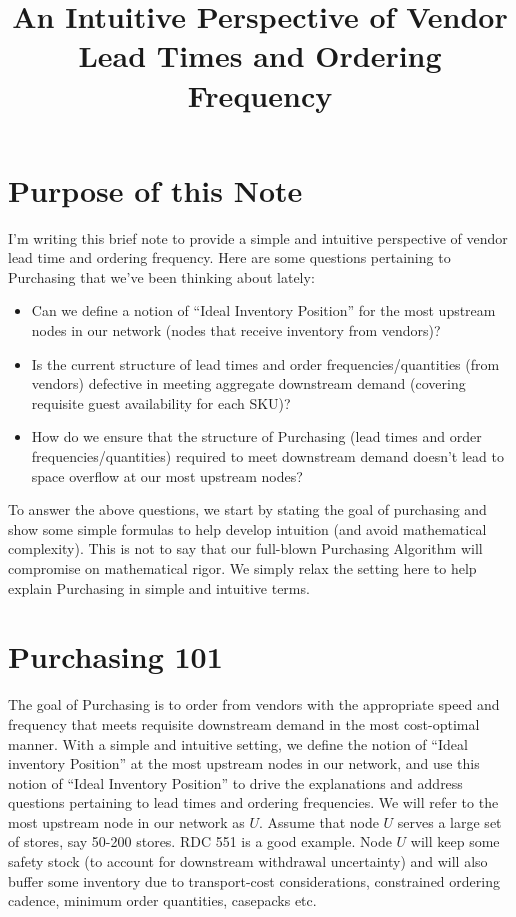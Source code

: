 \documentclass[11pt]{amsart}
\title{An Intuitive Perspective of Vendor Lead Times and Ordering Frequency}
\date{} %
\begin{document}
\maketitle

\section{Purpose of this Note}

I'm writing this brief note to provide a simple and intuitive perspective of vendor lead time and ordering frequency. Here are some questions pertaining to Purchasing that we've been thinking about lately:

\begin{itemize}
\item Can we define a notion of ``Ideal Inventory Position'' for the most upstream nodes in our network (nodes that receive inventory from vendors)?
\item Is the current structure of lead times and order frequencies/quantities (from vendors) defective in meeting aggregate downstream demand (covering requisite guest availability for each SKU)?  
\item How do we ensure that the structure of Purchasing (lead times and order frequencies/quantities) required to meet downstream demand doesn't lead to space overflow at our most upstream nodes?
\end{itemize}

To answer the above questions, we start by stating the goal of purchasing and show some simple formulas to help develop intuition (and avoid mathematical complexity). This is not to say that our full-blown Purchasing Algorithm will compromise on mathematical rigor. We simply relax the setting here to help explain Purchasing in simple and intuitive terms.

\section{Purchasing 101}

The goal of Purchasing is to order from vendors with the appropriate speed and frequency that meets requisite downstream demand in the most cost-optimal manner. With a simple and intuitive setting, we define the notion of ``Ideal inventory Position'' at the most upstream nodes in our network, and use this notion of ``Ideal Inventory Position'' to drive the explanations and address questions pertaining to lead times and ordering frequencies. We will refer to the most upstream node in our network as $U$. Assume that node $U$ serves a large set of stores, say 50-200 stores. RDC 551 is a good example. Node $U$ will keep some safety stock (to account for downstream withdrawal uncertainty) and will also buffer some inventory due to transport-cost considerations, constrained ordering cadence, minimum order quantities, casepacks etc.
 
\end{document}
